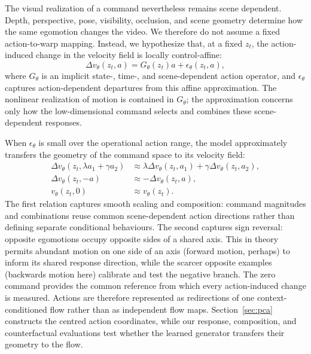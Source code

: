 \documentclass[letterpaper]{article} %
\begin{document}
The visual realization of a command nevertheless remains scene dependent.
Depth, perspective, pose, visibility, occlusion, and scene geometry determine
how the same egomotion changes the video. We therefore do not assume a fixed
action-to-warp mapping. Instead, we hypothesize that, at a fixed $z_t$, the
action-induced change in the velocity field is locally control-affine:
\begin{equation}
    \Delta v_\theta(z_t,a)
    =
    G_\theta(z_t)a
    +
    \epsilon_\theta(z_t,a),
    \label{eq:implicit_control_affine}
\end{equation}
where $G_\theta$ is an implicit state-, time-, and scene-dependent action
operator, and $\epsilon_\theta$ captures action-dependent departures from
this affine approximation. The nonlinear realization of motion is contained
in $G_\theta$; the approximation concerns only how the low-dimensional
command selects and combines these scene-dependent responses.

When $\epsilon_\theta$ is small over the operational action range, the model
approximately transfers the geometry of the command space to its velocity
field:
\begin{equation}
    \begin{aligned}
        \Delta v_\theta(z_t,\lambda a_1+\gamma a_2)
        &\approx
        \lambda\Delta v_\theta(z_t,a_1)
        +
        \gamma\Delta v_\theta(z_t,a_2),\\
        \Delta v_\theta(z_t,-a)
        &\approx
        -\Delta v_\theta(z_t,a),\\
        v_\theta(z_t,0)
        &\approx
        v_\theta(z_t).
    \end{aligned}
    \label{eq:control_affine_predictions}
\end{equation}
The first relation captures smooth scaling and composition: command
magnitudes and combinations reuse common scene-dependent action directions
rather than defining separate conditional behaviours. The second captures
sign reversal: opposite egomotions occupy opposite sides of a shared axis.
This in theory permits abundant motion on one side of an axis (forward motion, perhaps) to inform its shared
response direction, while the scarcer opposite examples (backwards motion here) calibrate and test the negative branch. The
zero command provides the common reference from which every action-induced
change is measured. Actions are therefore represented as redirections of one
context-conditioned flow rather than as independent flow maps. Section~\ref{sec:pca}
constructs the centred action coordinates, while our response, composition,
and counterfactual evaluations test whether the learned generator transfers
their geometry to the flow.
\end{document}
